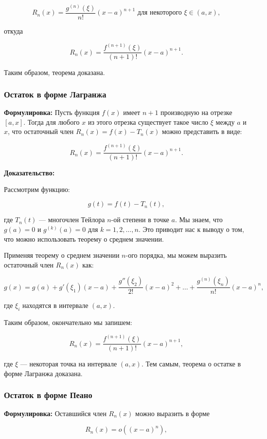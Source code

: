 \[
R_n(x) = \frac{g^{(n)}(\xi)}{n!}(x-a)^{n+1} \text{ для некоторого } \xi \in (a, x),
\]

откуда

\[
R_n(x) = \frac{f^{(n+1)}(\xi)}{(n+1)!}(x-a)^{n+1}.
\]

Таким образом, теорема доказана.

\subsubsection{Остаток в форме Лагранжа}

\textbf{Формулировка:} Пусть функция \( f(x) \) имеет \( n+1 \) производную на отрезке \( [a, x] \). Тогда для любого \( x \) из этого отрезка существует такое число \( \xi \) между \( a \) и \( x \), что остаточный член \( R_n(x) = f(x) - T_n(x) \) можно представить в виде:

\[
R_n(x) = \frac{f^{(n+1)}(\xi)}{(n+1)!} (x-a)^{n+1}.
\]

\textbf{Доказательство:} 

Рассмотрим функцию:

\[
g(t) = f(t) - T_n(t),
\]

где \( T_n(t) \) — многочлен Тейлора \( n \)-ой степени в точке \( a \). Мы знаем, что \( g(a) = 0 \) и \( g^{(k)}(a) = 0 \) для \( k = 1, 2, \dots, n \). Это приводит нас к выводу о том, что можно использовать теорему о среднем значении.

Применяя теорему о среднем значении \( n \)-ого порядка, мы можем выразить остаточный член \( R_n(x) \) как:

\[
g(x) = g(a) + g'(\xi_1)(x-a) + \frac{g''(\xi_2)}{2!}(x-a)^2 + \ldots + \frac{g^{(n)}(\xi_n)}{n!}(x-a)^n,
\]

где \( \xi_i \) находятся в интервале \( (a, x) \).

Таким образом, окончательно мы запишем:

\[
R_n(x) = \frac{f^{(n+1)}(\xi)}{(n+1)!}(x-a)^{n+1},
\]

где \( \xi \) — некоторая точка на интервале \( (a, x) \). Тем самым, теорема о остатке в форме Лагранжа доказана.

\subsubsection{Остаток в форме Пеано}

\textbf{Формулировка:} Оставшийся член \( R_n(x) \) можно выразить в форме

\[
R_n(x) = o((x-a)^{n}),
\]

